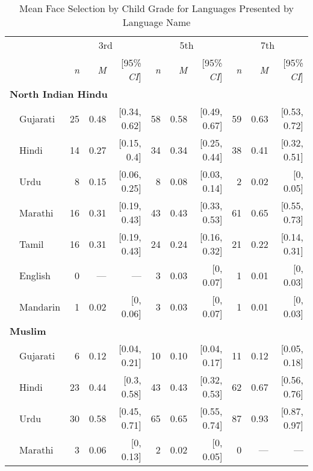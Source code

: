 \begin{table}[t]
\centering
\caption{Mean Face Selection by Child Grade for Languages Presented by Language Name}
\begin{footnotesize}
\label{tab:face-label-means}
\begin{tabular}{p{.1in}lrrrrrrrrr}
\toprule
 &  & \multicolumn{3}{c}{3rd} & \multicolumn{3}{c}{5th} & \multicolumn{3}{c}{7th} \\
\cline{3-5} \cline{6-8} \cline{9-11}
&  & \textit{n} & \textit{M} & [95\% \textit{CI}] &  \textit{n} & \textit{M} & [95\% \textit{CI}] &  \textit{n}  & \textit{M} & [95\% \textit{CI}]\\
\midrule
\multicolumn{11}{l}{\textbf{North Indian Hindu}}\\
& Gujarati & 25 & 0.48 & [0.34, 0.62] & 58 & 0.58 & [0.49, 0.67] & 59 & 0.63 & [0.53, 0.72]\\

 & Hindi & 14 & 0.27 & [0.15, 0.4] & 34 & 0.34 & [0.25, 0.44] & 38 & 0.41 & [0.32, 0.51]\\

 & Urdu & 8 & 0.15 & [0.06, 0.25] & 8 & 0.08 & [0.03, 0.14] & 2 & 0.02 & [0, 0.05]\\

 & Marathi & 16 & 0.31 & [0.19, 0.43] & 43 & 0.43 & [0.33, 0.53] & 61 & 0.65 & [0.55, 0.73]\\

 & Tamil & 16 & 0.31 & [0.19, 0.43] & 24 & 0.24 & [0.16, 0.32] & 21 & 0.22 & [0.14, 0.31]\\

 & English & 0 & --- & --- & 3 & 0.03 & [0, 0.07] & 1 & 0.01 & [0, 0.03]\\

& Mandarin & 1 & 0.02 & [0, 0.06] & 3 & 0.03 & [0, 0.07] & 1 & 0.01 & [0, 0.03]\\

\midrule
\multicolumn{11}{l}{\textbf{Muslim}}\\
& Gujarati & 6 & 0.12 & [0.04, 0.21] & 10 & 0.10 & [0.04, 0.17] & 11 & 0.12 & [0.05, 0.18]\\

 & Hindi & 23 & 0.44 & [0.3, 0.58] & 43 & 0.43 & [0.32, 0.53] & 62 & 0.67 & [0.56, 0.76]\\

 & Urdu & 30 & 0.58 & [0.45, 0.71] & 65 & 0.65 & [0.55, 0.74] & 87 & 0.93 & [0.87, 0.97]\\

 & Marathi & 3 & 0.06 & [0, 0.13] & 2 & 0.02 & [0, 0.05] & 0 & --- & ---\\


\end{tabular}
\end{footnotesize}
\end{table}
